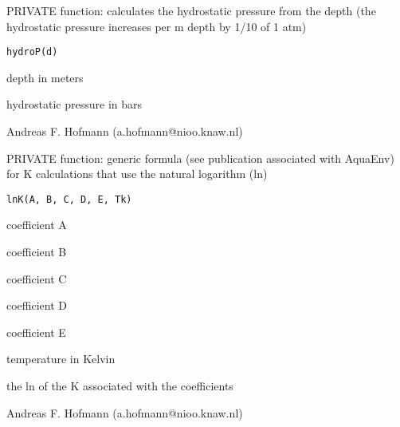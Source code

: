 \documentclass{article}
\begin{document}
\begin{Description}\relax
PRIVATE function: calculates the hydrostatic pressure from the depth (the hydrostatic pressure increases per m depth by 1/10 of 1 atm)
\end{Description}
\begin{Usage}
\begin{verbatim}hydroP(d)\end{verbatim}
\end{Usage}
\begin{Arguments}
\begin{ldescription}
\item[\code{d }] depth in meters
\end{ldescription}
\end{Arguments}
\begin{Value}
hydrostatic pressure in bars
\end{Value}
\begin{Author}\relax
Andreas F. Hofmann (a.hofmann@nioo.knaw.nl)
\end{Author}


\begin{Description}\relax
PRIVATE function: generic formula (see publication associated with AquaEnv) for K calculations that use the natural logarithm (ln)
\end{Description}
\begin{Usage}
\begin{verbatim}lnK(A, B, C, D, E, Tk)\end{verbatim}
\end{Usage}
\begin{Arguments}
\begin{ldescription}
\item[\code{A }] coefficient A
\item[\code{B }] coefficient B
\item[\code{C }] coefficient C
\item[\code{D }] coefficient D
\item[\code{E }] coefficient E
\item[\code{Tk }] temperature in Kelvin
\end{ldescription}
\end{Arguments}
\begin{Value}
the ln of the K associated with the coefficients
\end{Value}
\begin{Author}\relax
Andreas F. Hofmann (a.hofmann@nioo.knaw.nl)
\end{Author}
\end{document}
